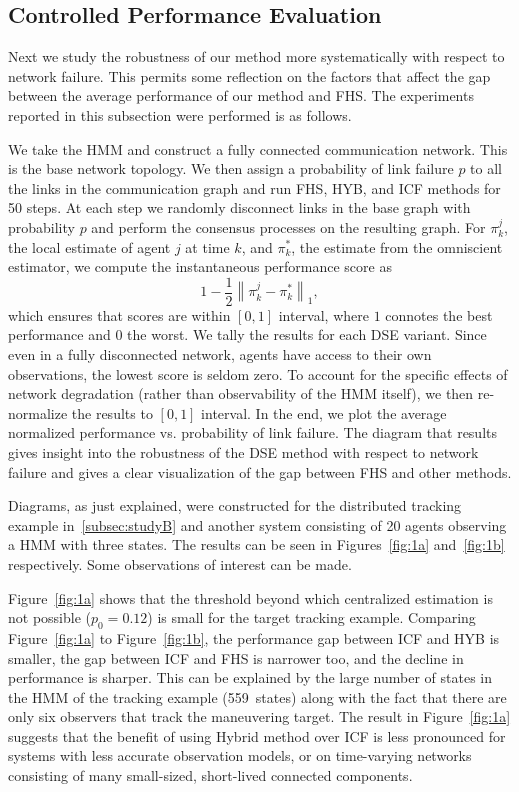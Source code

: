 \documentclass[journal]{IEEEtran}
\theoremstyle{remark}
\theoremstyle{definition}
\begin{document}
\subsection{Controlled Performance Evaluation} \label{subsec:eval}

Next we study the robustness of our method more systematically with respect to
network failure. This permits some reflection on the factors that affect the
gap between the average performance of our method and FHS.  The experiments
reported in this subsection were
performed is as follows.

We take the HMM and construct a fully connected communication network. 
This is the base network topology. We then assign a probability
of link failure  $p$ to all the links in the communication graph and run FHS,
HYB, and ICF methods for 50 steps. At each step we randomly disconnect links
in the base graph with probability $p$  and perform the consensus processes on
the resulting graph. For $\pi^j_k$,  the local estimate of agent $j$ at time
$k$, and $\pi^*_k$, the estimate from the omniscient
estimator,  we compute the instantaneous performance score as 
\begin{equation}
1-\frac{1}{2}\left\| \pi^j_k - \pi^*_k\right\|_1,
\end{equation}
which ensures that scores are within $[0,1]$ interval, where $1$ connotes the
best performance and $0$ the worst. We tally the results for each DSE
variant.
Since even in a fully disconnected network, agents have access to
their own observations, the lowest score is seldom zero. To account
for the specific effects of network degradation (rather than observability of
the HMM itself), we then re-normalize the results to $[0,1]$ interval.  In the
end, we plot the average normalized performance vs. probability of link
failure. The diagram that results gives insight into the robustness of the DSE
method with respect to network failure and gives a clear
visualization of the gap between FHS and other methods. 

Diagrams, as just explained, were constructed for the distributed tracking
example in~\ref{subsec:studyB} and another system consisting of 20
agents observing a HMM with three states.  The results can be seen in
Figures~\ref{fig:1a} and~\ref{fig:1b} respectively.  Some 
observations of interest can be made.

Figure~\ref{fig:1a} shows that the threshold beyond which centralized
estimation is not possible ($p_0= 0.12$) is small for the target tracking
example. Comparing
Figure~\ref{fig:1a} to  Figure~\ref{fig:1b}, the performance gap between ICF
and HYB is smaller, the gap between ICF and FHS is narrower too,
and the decline in performance is sharper. 
This can be explained by the large number of states in the HMM of the
tracking example (559~states) along with the fact that there are only six
observers that track the maneuvering target.  
The result in Figure~\ref{fig:1a} suggests
that the benefit of using Hybrid method over ICF is less pronounced for systems
with less accurate observation models, or on time-varying networks consisting
of many small-sized, short-lived connected components. 
\end{document}
